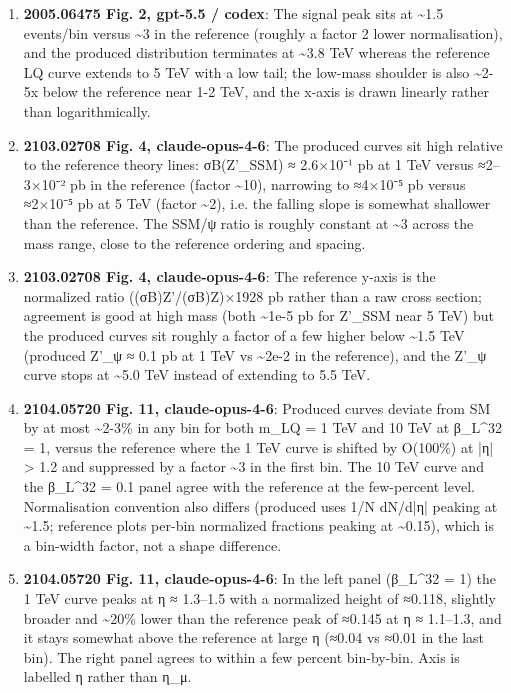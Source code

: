 \begin{enumerate}
\item \textbf{2005.06475 Fig. 2, gpt-5.5 / codex}: The signal peak sits at \textasciitilde{}1.5 events/bin versus \textasciitilde{}3 in the reference (roughly a factor 2 lower normalisation), and the produced distribution terminates at \textasciitilde{}3.8 TeV whereas the reference LQ curve extends to 5 TeV with a low tail; the low-mass shoulder is also \textasciitilde{}2-5x below the reference near 1-2 TeV, and the x-axis is drawn linearly rather than logarithmically.
\item \textbf{2103.02708 Fig. 4, claude-opus-4-6}: The produced curves sit high relative to the reference theory lines: σB(Z'\_SSM) ≈ 2.6×10⁻¹ pb at 1 TeV versus ≈2–3×10⁻² pb in the reference (factor \textasciitilde{}10), narrowing to ≈4×10⁻⁵ pb versus ≈2×10⁻⁵ pb at 5 TeV (factor \textasciitilde{}2), i.e. the falling slope is somewhat shallower than the reference. The SSM/ψ ratio is roughly constant at \textasciitilde{}3 across the mass range, close to the reference ordering and spacing.
\item \textbf{2103.02708 Fig. 4, claude-opus-4-6}: The reference y-axis is the normalized ratio ((σB)Z'/(σB)Z)×1928 pb rather than a raw cross section; agreement is good at high mass (both \textasciitilde{}1e-5 pb for Z'\_SSM near 5 TeV) but the produced curves sit roughly a factor of a few higher below \textasciitilde{}1.5 TeV (produced Z'\_ψ ≈ 0.1 pb at 1 TeV vs \textasciitilde{}2e-2 in the reference), and the Z'\_ψ curve stops at \textasciitilde{}5.0 TeV instead of extending to 5.5 TeV.
\item \textbf{2104.05720 Fig. 11, claude-opus-4-6}: Produced curves deviate from SM by at most \textasciitilde{}2-3\% in any bin for both m\_LQ = 1 TeV and 10 TeV at β\_L\textasciicircum{}32 = 1, versus the reference where the 1 TeV curve is shifted by O(100\%) at |η| > 1.2 and suppressed by a factor \textasciitilde{}3 in the first bin. The 10 TeV curve and the β\_L\textasciicircum{}32 = 0.1 panel agree with the reference at the few-percent level. Normalisation convention also differs (produced uses 1/N dN/d|η| peaking at \textasciitilde{}1.5; reference plots per-bin normalized fractions peaking at \textasciitilde{}0.15), which is a bin-width factor, not a shape difference.
\item \textbf{2104.05720 Fig. 11, claude-opus-4-6}: In the left panel (β\_L\textasciicircum{}32 = 1) the 1 TeV curve peaks at η ≈ 1.3–1.5 with a normalized height of ≈0.118, slightly broader and \textasciitilde{}20\% lower than the reference peak of ≈0.145 at η ≈ 1.1–1.3, and it stays somewhat above the reference at large η (≈0.04 vs ≈0.01 in the last bin). The right panel agrees to within a few percent bin-by-bin. Axis is labelled η rather than η\_μ.

\end{enumerate}
